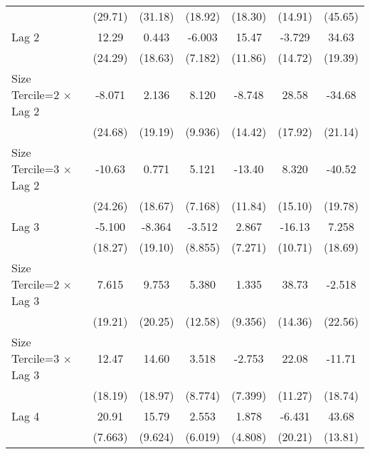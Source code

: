 \begin{table}[htbp]
\begin{tabular}{l*{6}{c}}
                &  (29.71)         &  (31.18)         &  (18.92)         &  (18.30)         &  (14.91)         &  (45.65)         \\
\addlinespace
Lag 2           &    12.29         &    0.443         &   -6.003         &    15.47         &   -3.729         &    34.63         \\
                &  (24.29)         &  (18.63)         &  (7.182)         &  (11.86)         &  (14.72)         &  (19.39)         \\
\addlinespace
Size Tercile=2 $\times$ Lag 2&   -8.071         &    2.136         &    8.120         &   -8.748         &    28.58         &   -34.68         \\
                &  (24.68)         &  (19.19)         &  (9.936)         &  (14.42)         &  (17.92)         &  (21.14)         \\
\addlinespace
Size Tercile=3 $\times$ Lag 2&   -10.63         &    0.771         &    5.121         &   -13.40         &    8.320         &   -40.52\sym{*}  \\
                &  (24.26)         &  (18.67)         &  (7.168)         &  (11.84)         &  (15.10)         &  (19.78)         \\
\addlinespace
Lag 3           &   -5.100         &   -8.364         &   -3.512         &    2.867         &   -16.13         &    7.258         \\
                &  (18.27)         &  (19.10)         &  (8.855)         &  (7.271)         &  (10.71)         &  (18.69)         \\
\addlinespace
Size Tercile=2 $\times$ Lag 3&    7.615         &    9.753         &    5.380         &    1.335         &    38.73\sym{**} &   -2.518         \\
                &  (19.21)         &  (20.25)         &  (12.58)         &  (9.356)         &  (14.36)         &  (22.56)         \\
\addlinespace
Size Tercile=3 $\times$ Lag 3&    12.47         &    14.60         &    3.518         &   -2.753         &    22.08         &   -11.71         \\
                &  (18.19)         &  (18.97)         &  (8.774)         &  (7.399)         &  (11.27)         &  (18.74)         \\
\addlinespace
Lag 4           &    20.91\sym{**} &    15.79         &    2.553         &    1.878         &   -6.431         &    43.68\sym{**} \\
                &  (7.663)         &  (9.624)         &  (6.019)         &  (4.808)         &  (20.21)         &  (13.81)         \\

\end{tabular}
\end{table}
